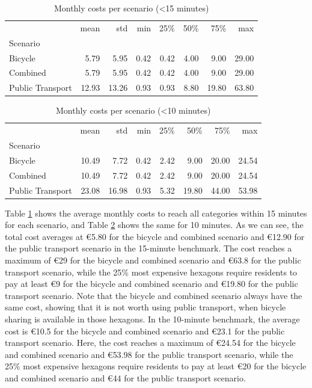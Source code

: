 \begin{table}
  \caption{Monthly costs per scenario (<15 minutes)}
  \label{tab:monthly_costs_per_scenario_15}
  \begin{center}
    \begin{tabular}{lrrrrrrr}
     & mean & std & min & 25\% & 50\% & 75\% & max \\
    Scenario &  &  &  &  &  &  &  \\
    Bicycle & 5.79 & 5.95 & 0.42 & 0.42 & 4.00 & 9.00 & 29.00 \\
    Combined & 5.79 & 5.95 & 0.42 & 0.42 & 4.00 & 9.00 & 29.00 \\
    Public Transport & 12.93 & 13.26 & 0.93 & 0.93 & 8.80 & 19.80 & 63.80 \\
    \end{tabular}
  \end{center}
\end{table}


\begin{table}
  \caption{Monthly costs per scenario (<10 minutes)}
  \label{tab:monthly_costs_per_scenario_10}
  \begin{center}
    \begin{tabular}{lrrrrrrr}
     & mean & std & min & 25\% & 50\% & 75\% & max \\
    Scenario &  &  &  &  &  &  &  \\
    Bicycle & 10.49 & 7.72 & 0.42 & 2.42 & 9.00 & 20.00 & 24.54 \\
    Combined & 10.49 & 7.72 & 0.42 & 2.42 & 9.00 & 20.00 & 24.54 \\
    Public Transport & 23.08 & 16.98 & 0.93 & 5.32 & 19.80 & 44.00 & 53.98 \\
    \end{tabular}
  \end{center}
\end{table}

Table \ref{tab:monthly_costs_per_scenario_15} shows the average monthly costs to reach all categories within 15 minutes for each scenario, and Table \ref{tab:monthly_costs_per_scenario_10} shows the same for 10 minutes.
As we can see, the total cost averages at \euro{5.80} for the bicycle and combined scenario and \euro{12.90} for the public transport scenario in the 15-minute benchmark.
The cost reaches a maximum of \euro{29} for the bicycle and combined scenario and \euro{63.8} for the public transport scenario, while the 25\% most expensive hexagons require residents to pay at least \euro{9} for the bicycle and combined scenario and \euro{19.80} for the public transport scenario.
Note that the bicycle and combined scenario always have the same cost, showing that it is not worth using public transport, when bicycle sharing is available in those hexagons.
In the 10-minute benchmark, the average cost is \euro{10.5} for the bicycle and combined scenario and \euro{23.1} for the public transport scenario.
Here, the cost reaches a maximum of \euro{24.54} for the bicycle and combined scenario and \euro{53.98} for the public transport scenario, while the 25\% most expensive hexagons require residents to pay at least \euro{20} for the bicycle and combined scenario and \euro{44} for the public transport scenario.

